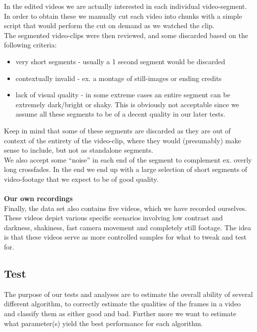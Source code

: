 \documentclass[12pt]{article}
\begin{document}
%
In the edited videos we are actually interested in each individual video-segment. In order to obtain these we manually cut each video into chunks with a simple script that would perform the cut on demand as we watched the clip.\\ %
The segmented video-clips were then reviewed, and some discarded based on the following criteria:
%
\begin{itemize}
\item very short segments - usually a 1 second segment would be discarded
\item contextually invalid - ex. a montage of still-images or ending credits
\item lack of visual quality - in some extreme cases an entire segment can be extremely dark/bright or shaky. This is obviously not acceptable since we assume all these segments to be of a decent quality in our later tests.
\end{itemize}
%
Keep in mind that some of these segments are discarded as they are out of context of the entirety of the video-clip, where they would (presumably) make sense to include, but not as standalone segments.\\
We also accept some “noise” in each end of the segment to complement ex. overly long crossfades. In the end we end up with a large selection of short segments of video-footage that we expect to be of good quality.\\\\
%
\textbf{Our own recordings}\\
Finally, the data set also contains five videos, which we have recorded ourselves. These videos depict various specific scenarios involving low contrast and darkness, shakiness, fast camera movement and completely still footage. The idea is that these videos serve as more controlled samples for what to tweak and test for.
%
\subsection{Test}
%
The purpose of our tests and analyses are to estimate the overall ability of several different algorithm, to correctly estimate the qualities of the frames in a video and classify them as either good and bad. Further more we want to estimate what parameter(s) yield the best performance for each algorithm.
%
\end{document}
